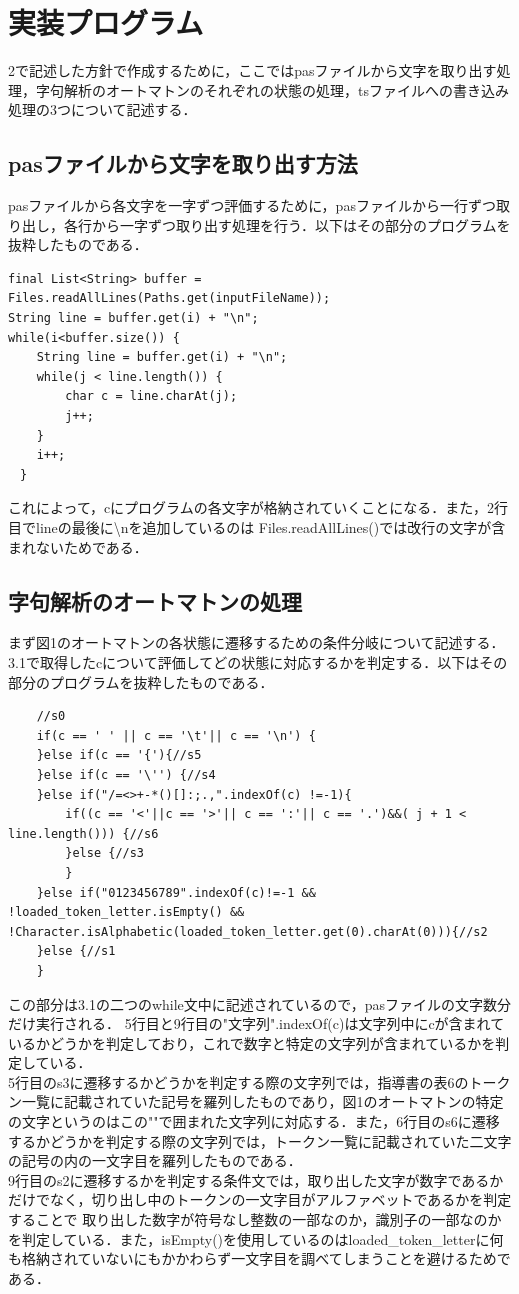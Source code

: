 \documentclass[dvipdfmx]{jarticle}
\begin{document}
\section{実装プログラム}
2で記述した方針で作成するために，ここではpasファイルから文字を取り出す処理，字句解析のオートマトンのそれぞれの状態の処理，tsファイルへの書き込み処理の3つについて記述する．
\subsection{pasファイルから文字を取り出す方法}
pasファイルから各文字を一字ずつ評価するために，pasファイルから一行ずつ取り出し，各行から一字ずつ取り出す処理を行う．以下はその部分のプログラムを抜粋したものである．
\begin{lstlisting}
final List<String> buffer = Files.readAllLines(Paths.get(inputFileName));
String line = buffer.get(i) + "\n";
while(i<buffer.size()) {
    String line = buffer.get(i) + "\n";
    while(j < line.length()) {
        char c = line.charAt(j);
        j++;
    }			
    i++;
　}
\end{lstlisting}
これによって，cにプログラムの各文字が格納されていくことになる．また，2行目でlineの最後に\textbackslash nを追加しているのは
Files.readAllLines()では改行の文字が含まれないためである．
\subsection{字句解析のオートマトンの処理}
まず図1のオートマトンの各状態に遷移するための条件分岐について記述する．3.1で取得したcについて評価してどの状態に対応するかを判定する．以下はその部分のプログラムを抜粋したものである．
\begin{lstlisting}
    //s0
    if(c == ' ' || c == '\t'|| c == '\n') {
    }else if(c == '{'){//s5
    }else if(c == '\'') {//s4
    }else if("/=<>+-*()[]:;.,".indexOf(c) !=-1){
        if((c == '<'||c == '>'|| c == ':'|| c == '.')&&( j + 1 < line.length())) {//s6
        }else {//s3
        }
    }else if("0123456789".indexOf(c)!=-1 && !loaded_token_letter.isEmpty() && !Character.isAlphabetic(loaded_token_letter.get(0).charAt(0))){//s2
    }else {//s1
    }
\end{lstlisting}
この部分は3.1の二つのwhile文中に記述されているので，pasファイルの文字数分だけ実行される．
5行目と9行目の"文字列".indexOf(c)は文字列中にcが含まれているかどうかを判定しており，これで数字と特定の文字列が含まれているかを判定している．
\\5行目のs3に遷移するかどうかを判定する際の文字列では，指導書の表6のトークン一覧に記載されていた記号を羅列したものであり，図1のオートマトンの特定の文字というのはこの""で囲まれた文字列に対応する．また，6行目のs6に遷移するかどうかを判定する際の文字列では，トークン一覧に記載されていた二文字の記号の内の一文字目を羅列したものである．
\\9行目のs2に遷移するかを判定する条件文では，取り出した文字が数字であるかだけでなく，切り出し中のトークンの一文字目がアルファベットであるかを判定することで
取り出した数字が符号なし整数の一部なのか，識別子の一部なのかを判定している．また，isEmpty()を使用しているのはloaded\_token\_letterに何も格納されていないにもかかわらず一文字目を調べてしまうことを避けるためである．
\end{document}
